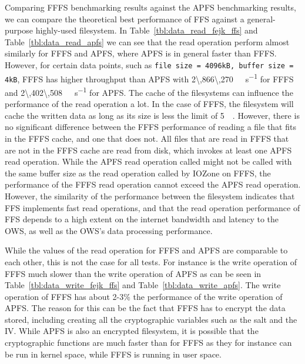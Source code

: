 Comparing \gls{FFFS} benchmarking results against the \gls{APFS} benchmarking results, we can compare the theoretical best performance of \gls{FFS} against a general-purpose highly-used filesystem. In Table~\ref{tbl:data_read_fejk_ffs} and Table~\ref{tbl:data_read_apfs} we can see that the read operation perform almost similarly for \gls{FFFS} and \gls{APFS}, where \gls{APFS} is in general faster than \gls{FFFS}. However, for certain data points, such as \texttt{file size = 4096kB, buffer size = 4kB}, \gls{FFFS} has higher throughput than \gls{APFS} with \SI[per-mode = symbol]{2\,866\,270}{\kilo\byte\per\second} for \gls{FFFS} and \SI[per-mode = symbol]{2\,402\,508}{\kilo\byte\per\second} for \gls{APFS}. The cache of the filesystems can influence the performance of the read operation a lot. In the case of \gls{FFFS}, the filesystem will cache the written data as long as its size is less the limit of \SI{5}{\mega\byte}. However, there is no significant difference between the \gls{FFFS} performance of reading a file that fits in the \gls{FFFS} cache, and one that does not. All files that are read in \gls{FFFS} that are not in the \gls{FFFS} cache are read from disk, which invokes at least one \gls{APFS} read operation. While the \gls{APFS} read operation called might not be called with the same buffer size as the read operation called by IOZone on \gls{FFFS}, the performance of the \gls{FFFS} read operation cannot exceed the \gls{APFS} read operation. However, the similarity of the performance between the filesystem indicates that \gls{FFS} implements fast read operations, and that the read operation performance of \gls{FFS} depends to a high extent on the internet bandwidth and latency to the \gls{OWS}, as well as the \gls{OWS}'s data processing performance.

While the values of the read operation for \gls{FFFS} and \gls{APFS} are comparable to each other, this is not the case for all tests. For instance is the write operation of \gls{FFFS} much slower than the write operation of \gls{APFS} as can be seen in Table~\ref{tbl:data_write_fejk_ffs} and Table~\ref{tbl:data_write_apfs}. The write operation of \gls{FFFS} has about 2-3\% the performance of the write operation of \gls{APFS}. The reason for this can be the fact that \gls{FFFS} has to encrypt the data stored, including creating all the cryptographic variables such as the salt and the \gls{IV}. While \gls{APFS} is also an encrypted filesystem, it is possible that the cryptographic functions are much faster than for \gls{FFFS} as they for instance can be run in kernel space, while \gls{FFFS} is running in user space.

